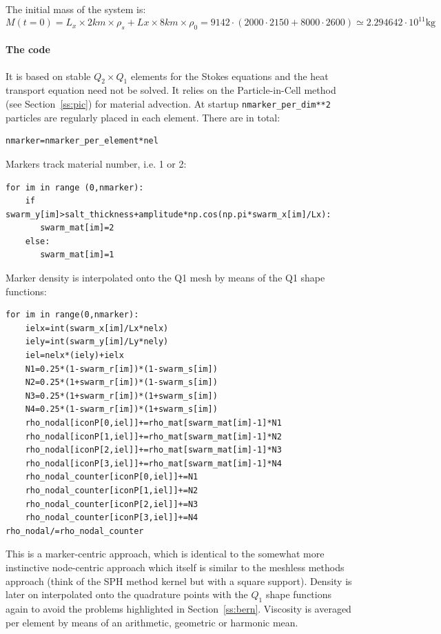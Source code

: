 The initial mass of the system is:
\[
M(t=0) = L_x \times 2km \times \rho_s + Lx \times 8km \times \rho_0 = 
9142 \cdot(2000\cdot 2150 + 8000\cdot 2600) \simeq 2.294642\cdot 10^{11}\text{kg}
\]

\paragraph{The code} It is based on stable $Q_2\times Q_1$ elements for the Stokes equations and 
the heat transport equation need not be solved. 
It relies on the Particle-in-Cell method (see Section~\ref{ss:pic}) for material advection. 
At startup {\tt nmarker\_per\_dim**2} particles are regularly placed in each element. 
There are in total:
\begin{lstlisting}
nmarker=nmarker_per_element*nel
\end{lstlisting}

Markers track material number, i.e. 1 or 2:
\begin{lstlisting}
for im in range (0,nmarker):
    if swarm_y[im]>salt_thickness+amplitude*np.cos(np.pi*swarm_x[im]/Lx):
       swarm_mat[im]=2
    else:
       swarm_mat[im]=1
\end{lstlisting}

Marker density is interpolated onto the Q1 mesh by means of the Q1 shape functions:
\begin{lstlisting}
for im in range(0,nmarker):
    ielx=int(swarm_x[im]/Lx*nelx)
    iely=int(swarm_y[im]/Ly*nely)
    iel=nelx*(iely)+ielx
    N1=0.25*(1-swarm_r[im])*(1-swarm_s[im])
    N2=0.25*(1+swarm_r[im])*(1-swarm_s[im])
    N3=0.25*(1+swarm_r[im])*(1+swarm_s[im])
    N4=0.25*(1-swarm_r[im])*(1+swarm_s[im])
    rho_nodal[iconP[0,iel]]+=rho_mat[swarm_mat[im]-1]*N1
    rho_nodal[iconP[1,iel]]+=rho_mat[swarm_mat[im]-1]*N2
    rho_nodal[iconP[2,iel]]+=rho_mat[swarm_mat[im]-1]*N3
    rho_nodal[iconP[3,iel]]+=rho_mat[swarm_mat[im]-1]*N4
    rho_nodal_counter[iconP[0,iel]]+=N1
    rho_nodal_counter[iconP[1,iel]]+=N2
    rho_nodal_counter[iconP[2,iel]]+=N3
    rho_nodal_counter[iconP[3,iel]]+=N4
rho_nodal/=rho_nodal_counter
\end{lstlisting}
This is a marker-centric approach, which is identical to the 
somewhat more instinctive node-centric approach which itself is similar
to the meshless methods approach (think of the SPH method kernel but with a 
square support). Density is later on interpolated onto the quadrature points 
with the $Q_1$ shape functions again to avoid the problems highlighted in 
Section~\ref{ss:bern}.
Viscosity is averaged per element by means of an arithmetic, geometric or harmonic mean.

